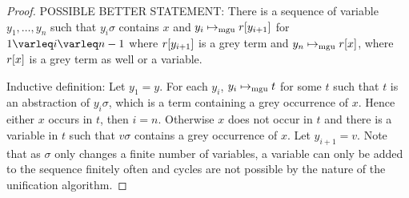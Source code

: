 \documentclass[,%
	draft=false,%
	numbers=noendperiod
	11pt,
	a4paper,
	oneside,%
	openany,
]{memoir}
\begin{document}
\begin{proof}
	
	POSSIBLE BETTER STATEMENT:
	There is a sequence of variable $y_1, \dots, y_n$ such that $y_i\sigma$ contains $x$ and $y_i \mapsto_{\operatorname{mgu}} r[y_{i+1}]$ for $1\varleq i \varleq n-1$ where $r[y_{i+1}]$ is a grey term and $y_n \mapsto_{\operatorname{mgu}} r[x]$, where $r[x]$ is a grey term as well or a variable.

	Inductive definition:
	Let $y_1 = y$. For each $y_i$, $y_i \mapsto_{\operatorname{mgu}} t$ for some $t$ such that $t$ is an abstraction of $y_i\sigma$, which is a term containing a grey occurrence of $x$.
	Hence either $x$ occurs in $t$, then $i=n$.
	Otherwise $x$ does not occur in $t$ and there is a variable in $t$ such that $v\sigma$ contains a grey occurrence of $x$.
	Let $y_{i+1} = v$.
	Note that as $\sigma$ only changes a finite number of variables, a variable can only be added to the sequence finitely often and cycles are not possible by the nature of the unification algorithm.
\end{proof}
\end{document}
